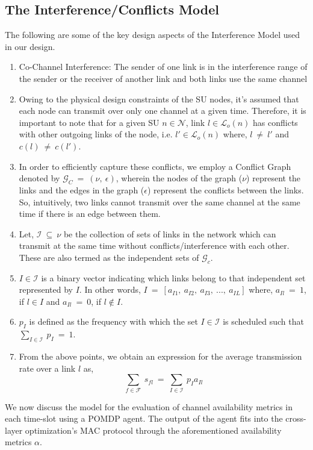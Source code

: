 \documentclass[12pt, draftcls, onecolumn]{IEEEtran}
\begin{document}
\subsection{The Interference/Conflicts Model}
The following are some of the key design aspects of the Interference Model used in our design.
\begin{enumerate}
    \item Co-Channel Interference: The sender of one link is in the interference range of the sender or the receiver of another link and both links use the same channel
    \item Owing to the physical design constraints of the SU nodes, it's assumed that each node can transmit over only one channel at a given time. Therefore, it is important to note that for a given SU $n \in \mathcal{N}$, link $l \in \mathcal{L}_o(n)$ has conflicts with other outgoing links of the node, i.e. $l' \in \mathcal{L}_o(n)$ where, $l\ \not=\ l'$ and $c(l)\ \not=\ c(l')$.
    \item In order to efficiently capture these conflicts, we employ a {Conflict Graph} denoted by $\mathcal{G}_C\ =\ (\nu,\ \epsilon)$, wherein the nodes of the graph ($\nu$) represent the links and the edges in the graph ($\epsilon$) represent the conflicts between the links. So, intuitively, two links cannot transmit over the same channel at the same time if there is an edge between them.
    \item Let, $\mathcal{I}\ \subseteq\ \nu$ be the collection of sets of links in the network which can transmit at the same time without conflicts/interference with each other. These are also termed as the independent sets of $\mathcal{G}_c$.
    \item $I \in \mathcal{I}$ is a binary vector indicating which links belong to that independent set represented by $I$. In other words, $I\ =\ [a_{I1},\ a_{I2},\ a_{I3},\ ...,\ a_{IL}]$ where, $a_{Il}\ =\ 1$, if $l \in I$ and $a_{Il}\ =\ 0$, if $l \not\in I$.
    \item $p_I$ is defined as the frequency with which the set $I \in \mathcal{I}$ is scheduled such that $\sum_{I \in \mathcal{I}}\ p_I\ =\ 1$.
    \item From the above points, we obtain an expression for the average transmission rate over a link $l$ as,
    \[\sum_{f \in \mathcal{F}}\ s_{fl}\ =\ \sum_{I \in \mathcal{I}}\ p_I a_{Il}\]
\end{enumerate}
We now discuss the model for the evaluation of channel availability metrics in each time-slot using a POMDP agent. The output of the agent fits into the cross-layer optimization's MAC protocol through the aforementioned availability metrics $\alpha$.
\end{document}
